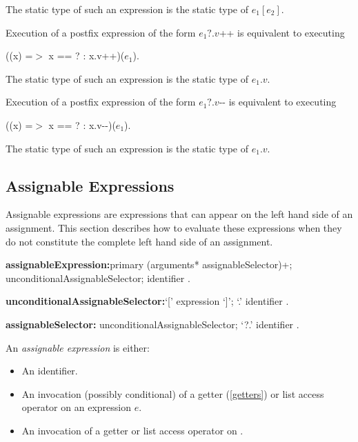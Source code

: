 \documentclass{article}
\newcommand{\code}[1]{{\sf #1}}
\begin{document}
\LMHash{}
The static type of such an expression is the static type of $e_1[e_2]$.

\LMHash{}
Execution of a postfix expression of the form \code{$e_1?.v$++} is equivalent to executing 

\code{((x) =$>$ x == \NULL? \NULL : x.v++)($e_1$)}.

\LMHash{}
The static type of such an expression is the static type of $e_1.v$.

\LMHash{}
Execution of a postfix expression of the form \code{$e_1?.v$-{}-} is equivalent to executing 

\code{((x) =$>$ x == \NULL? \NULL : x.v-{}-)($e_1$)}.

\LMHash{}
The static type of such an expression is the static type of $e_1.v$.


\subsection{ Assignable Expressions}

\LMHash{}
Assignable expressions are expressions that can appear on the left hand side of an assignment.
This section describes how to evaluate these expressions when they do not constitute the complete left hand side of an assignment.




\begin{grammar}

{\bf assignableExpression:}primary (arguments* assignableSelector)+;
      \SUPER{} unconditionalAssignableSelector;
      identifier
    .
    
{\bf unconditionalAssignableSelector:}`[' expression `]'; %
         `{\escapegrammar .}' identifier
    .

{\bf assignableSelector:}
         unconditionalAssignableSelector;
         `{\escapegrammar ?.}' identifier
    .

\end{grammar}


\LMHash{}
An {\em assignable expression} is either:
\begin{itemize}
 \item An identifier. 
\item An invocation (possibly conditional) of a getter (\ref{getters}) or list access operator on an expression $e$.
\item An invocation of a getter or list access operator on  \SUPER{}.
\end{itemize}
\end{document}
